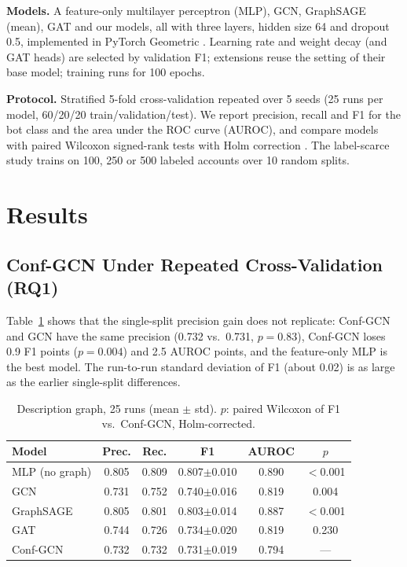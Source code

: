 \documentclass[conference,a4paper]{IEEEtran}
\begin{document}
\textbf{Models.} A feature-only multilayer perceptron (MLP), GCN, GraphSAGE (mean), GAT and our models, all with three layers, hidden size 64 and dropout 0.5, implemented in PyTorch Geometric \cite{fey2019pyg}. Learning rate and weight decay (and GAT heads) are selected by validation F1; extensions reuse the setting of their base model; training runs for 100 epochs.

\textbf{Protocol.} Stratified 5-fold cross-validation repeated over 5 seeds (25 runs per model, 60/20/20 train/validation/test). We report precision, recall and F1 for the bot class and the area under the ROC curve (AUROC), and compare models with paired Wilcoxon signed-rank tests with Holm correction \cite{demsar2006statistical,holm1979simple}. The label-scarce study trains on 100, 250 or 500 labeled accounts over 10 random splits.

\section{Results}

\subsection{Conf-GCN Under Repeated Cross-Validation (RQ1)}
Table~\ref{tab:main} shows that the single-split precision gain does not replicate: Conf-GCN and GCN have the same precision (0.732 vs.\ 0.731, $p=0.83$), Conf-GCN loses 0.9 F1 points ($p=0.004$) and 2.5 AUROC points, and the feature-only MLP is the best model. The run-to-run standard deviation of F1 (about 0.02) is as large as the earlier single-split differences.

\begin{table}[htbp]
\caption{Description graph, 25 runs (mean $\pm$ std). $p$: paired Wilcoxon of F1 vs.\ Conf-GCN, Holm-corrected.}
\label{tab:main}
\centering
\footnotesize
\setlength{\tabcolsep}{3pt}
\begin{tabular}{@{}lccccc@{}}
\toprule
Model & Prec. & Rec. & F1 & AUROC & $p$\\
\midrule
MLP (no graph) & 0.805 & 0.809 & 0.807$\pm$0.010 & 0.890 & $<$0.001\\
GCN & 0.731 & 0.752 & 0.740$\pm$0.016 & 0.819 & 0.004\\
GraphSAGE & 0.805 & 0.801 & 0.803$\pm$0.014 & 0.887 & $<$0.001\\
GAT & 0.744 & 0.726 & 0.734$\pm$0.020 & 0.819 & 0.230\\
Conf-GCN & 0.732 & 0.732 & 0.731$\pm$0.019 & 0.794 & ---\\
\bottomrule
\end{tabular}
\end{table}
\end{document}
